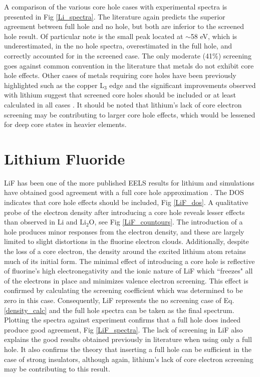 A comparison of the various core hole cases with experimental spectra is presented in Fig \ref{Li_spectra}. The literature again predicts the superior agreement between full hole and no hole, but both are inferior to the screened hole result.  Of particular note is the small peak located at $ \sim$58 eV, which is underestimated, in the no hole spectra, overestimated in the full hole, and correctly accounted for in the screened case.  The only moderate (41\%) screening goes against common convention in the literature that metals do not exhibit core hole effects.  Other cases of metals requiring core holes have been previously highlighted such as the copper L$_3$ edge and the significant improvements observed with lithium suggest that screened core holes should be included or at least calculated in all cases \cite{hebert_improvement_2003}.  It should be noted that lithium's lack of core electron screening may be contributing to larger core hole effects, which would be lessened for deep core states in heavier elements. 

\section{Lithium Fluoride}
LiF has been one of the more published EELS results for lithium and simulations have obtained good agreement with a full core hole approximation \cite{gao_theory_2008, mauchamp_ab_2006}.  The DOS indicates that core hole effects should be included, Fig \ref{LiF_dos}. A qualitative probe of the electron density after introducing a core hole reveals lesser effects than observed in Li and $ \mathrm{Li_2O} $, see Fig \ref{LiF_countours}.  The introduction of a hole produces minor responses from the electron density, and these are largely limited to slight distortions in the fluorine electron clouds. Additionally, despite the loss of a core electron, the density around the excited lithium atom retains much of its initial form. The minimal effect of introducing a core hole is reflective of fluorine's high electronegativity and the ionic nature of LiF which ``freezes" all of the electrons in place and minimizes valence electron screening.  This effect is confirmed by calculating the screening coefficient which was determined to be zero in this case. Consequently, LiF represents the no screening case of Eq. \ref{density_calc} and the full hole spectra can be taken as the final spectrum.  Plotting the spectra against experiment confirms that a full hole does indeed produce good agreement, Fig \ref{LiF_spectra}.  The lack of screening in LiF also explains the good results obtained previously in literature when using only a full hole.  It also confirms the theory that inserting a full hole can be sufficient in the case of strong insulators, although again, lithium's lack of core electron screening may be contributing to this result.

